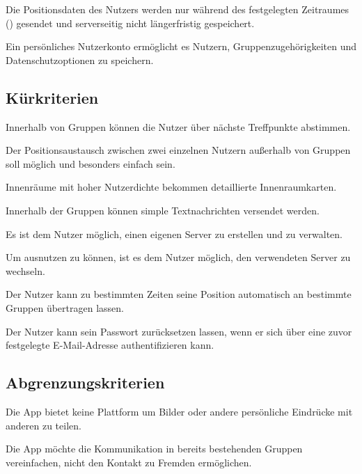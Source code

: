 \documentclass[parskip=full,11pt]{scrartcl}
\begin{document}
Die Positionsdaten des Nutzers werden nur während des festgelegten Zeitraumes
() gesendet und serverseitig nicht
längerfristig gespeichert.

Ein persönliches Nutzerkonto ermöglicht es Nutzern,
Gruppenzugehörigkeiten und Datenschutzoptionen zu speichern.

\subsection{Kürkriterien}
Innerhalb von Gruppen können die Nutzer über nächste Treffpunkte abstimmen.

Der Positionsaustausch zwischen zwei einzelnen Nutzern außerhalb von Gruppen
soll möglich und besonders einfach sein.

Innenräume mit hoher Nutzerdichte bekommen detaillierte Innenraumkarten.

Innerhalb der Gruppen können simple Textnachrichten versendet werden.

Es ist dem Nutzer möglich, einen eigenen Server zu erstellen und zu verwalten.

Um  ausnutzen zu können, ist es dem Nutzer
möglich, den verwendeten Server zu wechseln.

Der Nutzer kann zu bestimmten Zeiten seine Position automatisch an bestimmte
Gruppen übertragen lassen.

Der Nutzer kann sein Passwort zurücksetzen lassen, wenn er sich über eine zuvor
festgelegte E-Mail-Adresse authentifizieren kann.

\subsection{Abgrenzungskriterien}
Die App bietet keine Plattform um Bilder oder andere persönliche Eindrücke mit
anderen zu teilen.

Die App möchte die Kommunikation in bereits bestehenden Gruppen vereinfachen,
nicht den Kontakt zu Fremden ermöglichen.
\end{document}
